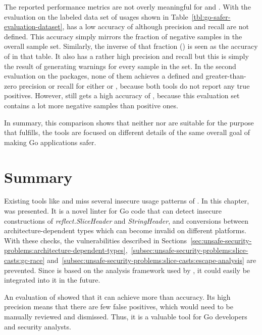 The reported performance metrics are not overly meaningful for \toolVet{} and \toolGosec{}.
With the evaluation on the labeled data set of \unsafe{} usages shown in Table~\ref{tbl:go-safer-evaluation-dataset},
\toolVet{} has a low accuracy of  although precision and recall are not defined.
This accuracy simply mirrors the fraction of negative samples in the overall sample set.
Similarly, the inverse of that fraction () is seen as the accuracy of \toolGosec{} in that table.
It also has a rather high precision and recall but this is simply the result of generating warnings for every sample in
the set.
In the second evaluation on the  packages, none of them achieves a defined and greater-than-zero precision
or recall for either \toolVet{} or \toolGosec{}, because both tools do not report any true positives.
However, \toolVet{} still gets a high accuracy of , because this evaluation set contains a lot more
negative samples than positive ones.

In summary, this comparison shows that neither \toolVet{} nor \toolGosec{} are suitable for the purpose that
\toolSafer{} fulfills, the tools are focused on different details of the same overall goal of making Go applications
safer.



\section{Summary}\label{sec:go-safer:summary}

Existing tools like \toolVet{} and \toolGosec{} miss several insecure usage patterns of \unsafe{}.
In this chapter, \toolSafer{} was presented.
It is a novel linter for Go code that can detect insecure constructions of \textit{reflect.SliceHeader} and
\textit{StringHeader}, and conversions between architecture-dependent types which can become invalid on different
platforms.
With these checks, the vulnerabilities described in
Sections~\ref{sec:unsafe-security-problems:architecture-dependent-types},~\ref{subsec:unsafe-security-problems:slice-casts:gc-race}
and~\ref{subsec:unsafe-security-problems:slice-casts:escape-analysis} are prevented.
Since \toolSafer{} is based on the analysis framework used by \toolVet{}, it could easily be integrated into it in the
future.

An evaluation of \toolSafer{} showed that it can achieve more than  accuracy.
Its high precision means that there are few false positives, which would need to be manually reviewed and dismissed.
Thus, it is a valuable tool for Go developers and security analysts.
